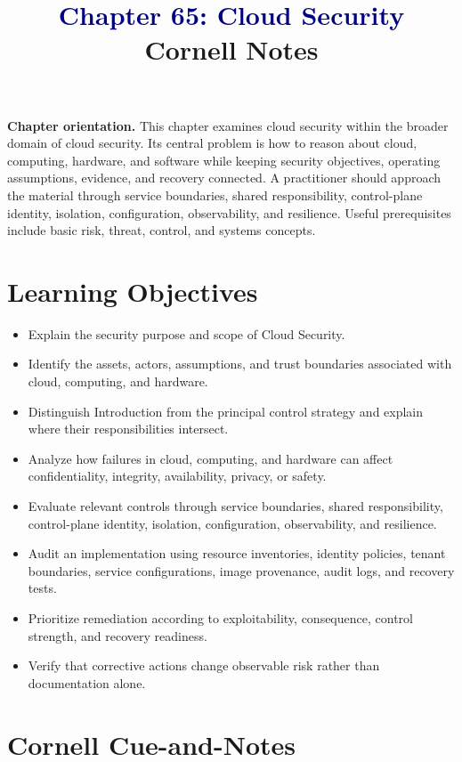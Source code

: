 \documentclass[11pt]{article}
\title{\textcolor{Navy}{Chapter 65: Cloud Security}\\[2mm]\large Cornell Notes}
\author{}
\date{}
\begin{document}
\maketitle
\thispagestyle{fancy}
\vspace{-1.5em}
\begin{orientationbox}
\textbf{Chapter orientation.} This chapter examines cloud security within the broader domain of cloud security. Its central problem is how to reason about cloud, computing, hardware, and software while keeping security objectives, operating assumptions, evidence, and recovery connected. A practitioner should approach the material through service boundaries, shared responsibility, control-plane identity, isolation, configuration, observability, and resilience. Useful prerequisites include basic risk, threat, control, and systems concepts.
\end{orientationbox}
\section*{Learning Objectives}
\begin{itemize}
\item Explain the security purpose and scope of Cloud Security.
\item Identify the assets, actors, assumptions, and trust boundaries associated with cloud, computing, and hardware.
\item Distinguish Introduction from the principal control strategy and explain where their responsibilities intersect.
\item Analyze how failures in cloud, computing, and hardware can affect confidentiality, integrity, availability, privacy, or safety.
\item Evaluate relevant controls through service boundaries, shared responsibility, control-plane identity, isolation, configuration, observability, and resilience.
\item Audit an implementation using resource inventories, identity policies, tenant boundaries, service configurations, image provenance, audit logs, and recovery tests.
\item Prioritize remediation according to exploitability, consequence, control strength, and recovery readiness.
\item Verify that corrective actions change observable risk rather than documentation alone.
\end{itemize}
\section*{Cornell Cue-and-Notes}
\end{document}
